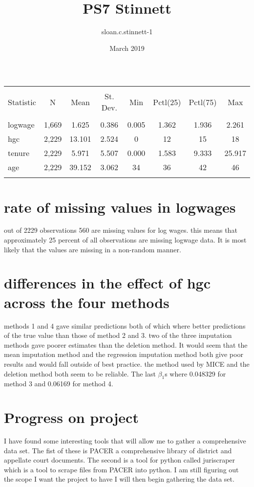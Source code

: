 \documentclass{article}
\title{PS7 Stinnett}
\author{sloan.c.stinnett-1 }
\date{March 2019}
\begin{document}
\maketitle

\begin{table}[!htbp] \centering 
  \caption{} 
  \label{} 
\begin{tabular}{@{\extracolsep{5pt}}lccccccc} 
\\[-1.8ex]\hline 
\hline \\[-1.8ex] 
Statistic & \multicolumn{1}{c}{N} & \multicolumn{1}{c}{Mean} & \multicolumn{1}{c}{St. Dev.} & \multicolumn{1}{c}{Min} & \multicolumn{1}{c}{Pctl(25)} & \multicolumn{1}{c}{Pctl(75)} & \multicolumn{1}{c}{Max} \\ 
\hline \\[-1.8ex] 
logwage & 1,669 & 1.625 & 0.386 & 0.005 & 1.362 & 1.936 & 2.261 \\ 
hgc & 2,229 & 13.101 & 2.524 & 0 & 12 & 15 & 18 \\ 
tenure & 2,229 & 5.971 & 5.507 & 0.000 & 1.583 & 9.333 & 25.917 \\ 
age & 2,229 & 39.152 & 3.062 & 34 & 36 & 42 & 46 \\ 
\hline \\[-1.8ex] 
\end{tabular} 
\end{table} 

\section{rate of missing values in logwages}
out of 2229 observations 560 are missing values for log wages. this means that  approximately 25 percent of all observations are missing logwage data. It is most likely that the values are missing in a non-random manner.

\section{differences in the effect of hgc across the four methods}
methods 1 and 4 gave similar predictions both of which where better predictions of the true value than those of method 2 and 3. two of the three imputation methods gave poorer estimates than the deletion method. It would seem that the mean imputation method and the regression imputation method both give poor results and would fall outside of best practice. the method used by MICE and the deletion method both seem to be reliable. The last \(\beta_1\)s where 0.048329 for method 3 and 0.06169 for method 4.

\section{Progress on project }
I have found some interesting tools that will allow me to gather a comprehensive data set. The fist of these is PACER a comprehensive library of district and appellate court documents. The second is a tool for python called juriscraper which is a tool to scrape files from PACER into python.
I am still figuring out the scope I want the project to have I will then begin gathering the data set. 
\end{document}

